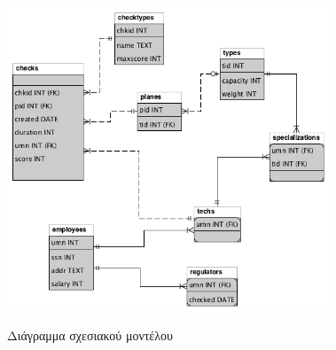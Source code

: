 \documentclass[a4paper]{article}
\begin{document}
\begin{figure}[h]
\centering
\includegraphics[width=0.855555\textwidth]{../../R_model/r-db.png}\\
\caption{Διάγραμμα σχεσιακού μοντέλου}
\end{figure}


\end{document}
